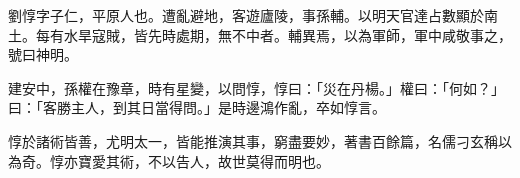 \begin{pinyinscope}
 
 
 劉惇字子仁，平原人也。遭亂避地，客遊廬陵，事孫輔。以明天官達占數顯於南土。每有水旱寇賊，皆先時處期，無不中者。輔異焉，以為軍師，軍中咸敬事之，號曰神明。
 
 
 
 
 建安中，孫權在豫章，時有星變，以問惇，惇曰：「災在丹楊。」權曰：「何如？」曰：「客勝主人，到其日當得問。」是時邊鴻作亂，卒如惇言。
 
 
 
 
 惇於諸術皆善，尤明太一，皆能推演其事，窮盡要妙，著書百餘篇，名儒刁玄稱以為奇。惇亦寶愛其術，不以告人，故世莫得而明也。
 
 
\end{pinyinscope}